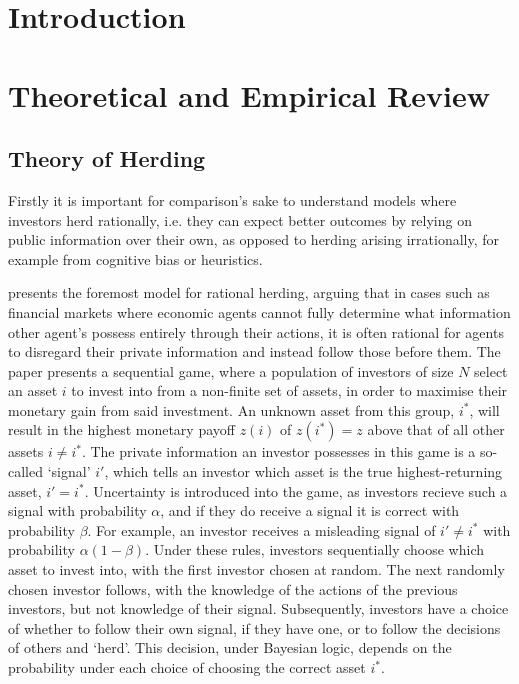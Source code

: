 \documentclass[12pt]{article}
\numberwithin{table}{section}   %
\begin{document}


\tableofcontents

\break

\section{Introduction}



\section{Theoretical and Empirical Review}

\subsection{Theory of Herding}

Firstly it is important for comparison’s sake to understand models where investors herd rationally, i.e. they can expect better outcomes by relying on public information over their own, as opposed to herding arising irrationally, for example from cognitive bias or heuristics.

\citet{banerjee} presents the foremost model for rational herding, arguing that in cases such as financial markets where economic agents cannot fully determine what information other agent’s possess entirely through their actions, it is often rational for agents to disregard their private information and instead follow those before them. The paper presents a sequential game, where a population of investors of size $N$ select an asset $i$ to invest into from a non-finite set of assets, in order to maximise their monetary gain from said investment. An unknown asset from this group, $i^*$, will result in the highest monetary payoff $z(i)$ of $z(i^*)=z$ above that of all other assets $i\neq{i^*}$. The private information an investor possesses in this game is a so-called ‘signal’ $i'$, which tells an investor which asset is the true highest-returning asset, $i'=i^*$. Uncertainty is introduced into the game, as investors recieve such a signal with probability $\alpha$, and if they do receive a signal it is correct with probability $\beta$. For example, an investor receives a misleading signal of  $i'\neq{i^*}$ with probability $\alpha(1-\beta)$. Under these rules, investors sequentially choose which asset to invest into, with the first investor chosen at random. The next randomly chosen investor follows, with the knowledge of the actions of the previous investors, but not knowledge of their signal. Subsequently, investors have a choice of whether to follow their own signal, if they have one, or to follow the decisions of others and ‘herd’. This decision, under Bayesian logic, depends on the probability under each choice of choosing the correct asset $i^*$.
\end{document}
